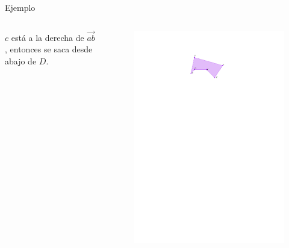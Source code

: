 \documentclass[aspectratio=169,xcolor=dvipsnames, t]{beamer}
\begin{document}
\begin{frame}{Ejemplo}
  \begin{columns}
    \begin{column}{0.5\textwidth}
      $c$ está a la derecha de $\overrightarrow{ab}$, entonces se saca desde abajo de $D$.
    \end{column}
    \begin{column}{0.5\textwidth}
      \begin{figure}
        \centering
        \includegraphics[width=\linewidth, height=0.5\textheight, page=4, keepaspectratio]{IPE/Melkman.pdf}
      \end{figure}
    \end{column}
  \end{columns}
\end{frame}
\end{document}
